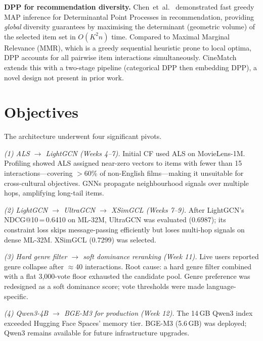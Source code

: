 \documentclass[conference]{IEEEtran}
\begin{document}
\textbf{DPP for recommendation diversity.}
Chen~et~al.~\cite{dpp} demonstrated fast greedy MAP inference for
Determinantal Point Processes in recommendation, providing \emph{global}
diversity guarantees by maximising the determinant (geometric volume)
of the selected item set in $O(K^2n)$ time.
Compared to Maximal Marginal Relevance (MMR), which is a greedy
sequential heuristic prone to local optima, DPP accounts for all
pairwise item interactions simultaneously.
CineMatch extends this with a two-stage pipeline (categorical DPP
then embedding DPP), a novel design not present in prior work.

\section{Objectives}

The architecture underwent four significant pivots.

\textit{(1) ALS $\to$ LightGCN (Weeks 4--7).}
Initial CF used ALS on MovieLens-1M.
Profiling showed ALS assigned near-zero vectors to items with fewer than
15 interactions---covering $>$60\% of non-English films---making it
unsuitable for cross-cultural objectives.
GNNs propagate neighbourhood signals over multiple hops, amplifying
long-tail items.

\textit{(2) LightGCN $\to$ UltraGCN $\to$ XSimGCL (Weeks 7--9).}
After LightGCN's NDCG@10\,=\,0.6410 on ML-32M, UltraGCN was evaluated
(0.6987); its constraint loss skips message-passing efficiently but
loses multi-hop signals on dense ML-32M.
XSimGCL (0.7299) was selected.

\textit{(3) Hard genre filter $\to$ soft dominance reranking (Week 11).}
Live users reported genre collapse after $\approx$40 interactions.
Root cause: a hard genre filter combined with a flat 3,000-vote floor
exhausted the candidate pool.
Genre preference was redesigned as a soft dominance score; vote thresholds
were made language-specific.

\textit{(4) Qwen3-4B $\to$ BGE-M3 for production (Week 12).}
The 14\,GB Qwen3 index exceeded Hugging Face Spaces' memory tier.
BGE-M3 (5.6\,GB) was deployed; Qwen3 remains available for future
infrastructure upgrades.
\end{document}
